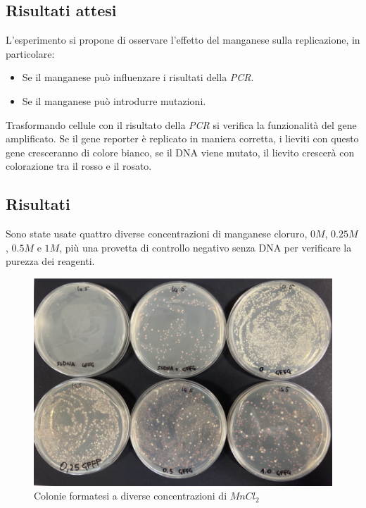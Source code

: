 	\subsection*{Risultati attesi}
	L'esperimento si propone di osservare l'effetto del manganese sulla replicazione, in particolare:
	\begin{itemize}
		\item Se il manganese pu\`o influenzare i risultati della \emph{PCR}.
       		\item Se il manganese pu\`o introdurre mutazioni.
	\end{itemize}
	Trasformando cellule con il risultato della \emph{PCR} si verifica la funzionalit\`a del gene amplificato.
        Se il gene reporter è replicato in maniera corretta, i lieviti con questo gene cresceranno di colore bianco, se il DNA viene mutato, il lievito crescerà con colorazione tra il rosso e il rosato.

   	\subsection*{Risultati}
        Sono state usate quattro diverse concentrazioni di manganese cloruro, $0M$, $0.25M$, $0.5M$ e $1M$, più una provetta di controllo negativo senza DNA per verificare la purezza dei reagenti.
	\begin{figure}[H]
		\centering
		\includegraphics[scale=0.4]{./Pics/MutVitro/Contebatteriche.png}
		\caption{Colonie formatesi a diverse concentrazioni di \emph{$MnCl_2$}}
		\label{fig1}
	\end{figure}

